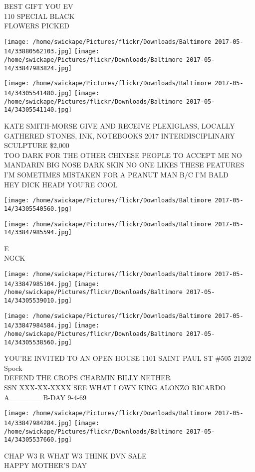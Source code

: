 \documentclass[10pt,letterpaper]{article}
\begin{document}
BEST GIFT YOU EV\\
110 SPECIAL BLACK\\
FLOWERS PICKED
\pagebreak

\texttt{[image: /home/swickape/Pictures/flickr/Downloads/Baltimore 2017-05-14/33880562103.jpg]}
\texttt{[image: /home/swickape/Pictures/flickr/Downloads/Baltimore 2017-05-14/33847983824.jpg]}

\texttt{[image: /home/swickape/Pictures/flickr/Downloads/Baltimore 2017-05-14/34305541480.jpg]}
\texttt{[image: /home/swickape/Pictures/flickr/Downloads/Baltimore 2017-05-14/34305541140.jpg]}

KATE SMITH{-}MORSE GIVE AND RECEIVE PLEXIGLASS, LOCALLY GATHERED STONES, INK, NOTEBOOKS 2017 INTERDISCIPLINARY SCULPTURE \$2,000\\
TOO DARK FOR THE OTHER CHINESE PEOPLE TO ACCEPT ME NO MANDARIN BIG NOSE DARK SKIN NO ONE LIKES THESE FEATURES\\
I'M SOMETIMES MISTAKEN FOR A PEANUT MAN B/C I'M BALD\\
HEY DICK HEAD!  YOU'RE COOL
\pagebreak

\texttt{[image: /home/swickape/Pictures/flickr/Downloads/Baltimore 2017-05-14/34305540560.jpg]}

\vspace{0.25in}
\texttt{[image: /home/swickape/Pictures/flickr/Downloads/Baltimore 2017-05-14/33847985594.jpg]}

E\\
NGCK
\pagebreak

\texttt{[image: /home/swickape/Pictures/flickr/Downloads/Baltimore 2017-05-14/33847985104.jpg]}
\texttt{[image: /home/swickape/Pictures/flickr/Downloads/Baltimore 2017-05-14/34305539010.jpg]}

\texttt{[image: /home/swickape/Pictures/flickr/Downloads/Baltimore 2017-05-14/33847984584.jpg]}
\texttt{[image: /home/swickape/Pictures/flickr/Downloads/Baltimore 2017-05-14/34305538560.jpg]}

YOU'RE INVITED TO AN OPEN HOUSE 1101 SAINT PAUL ST \#505 21202\\
Spock\\
DEFEND THE CROPS CHARMIN BILLY NETHER\\
SSN XXX{-}XX{-}XXXX SEE WHAT I OWN KING ALONZO RICARDO A\_\_\_\_\_\_ B{-}DAY 9{-}4{-}69
\pagebreak

\texttt{[image: /home/swickape/Pictures/flickr/Downloads/Baltimore 2017-05-14/33847984284.jpg]}
\texttt{[image: /home/swickape/Pictures/flickr/Downloads/Baltimore 2017-05-14/34305537660.jpg]}

CHAP W3 R WHAT W3 THINK DVN SALE\\
HAPPY MOTHER'S DAY
\pagebreak
\end{document}
